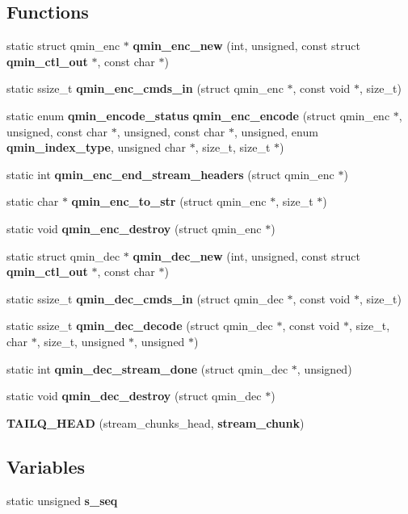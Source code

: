 \subsection*{Functions}
\begin{DoxyCompactItemize}
\item 
static struct qmin\+\_\+enc $\ast$ {\bf qmin\+\_\+enc\+\_\+new} (int, unsigned, const struct {\bf qmin\+\_\+ctl\+\_\+out} $\ast$, const char $\ast$)
\item 
static ssize\+\_\+t {\bf qmin\+\_\+enc\+\_\+cmds\+\_\+in} (struct qmin\+\_\+enc $\ast$, const void $\ast$, size\+\_\+t)
\item 
static enum {\bf qmin\+\_\+encode\+\_\+status} {\bf qmin\+\_\+enc\+\_\+encode} (struct qmin\+\_\+enc $\ast$, unsigned, const char $\ast$, unsigned, const char $\ast$, unsigned, enum {\bf qmin\+\_\+index\+\_\+type}, unsigned char $\ast$, size\+\_\+t, size\+\_\+t $\ast$)
\item 
static int {\bf qmin\+\_\+enc\+\_\+end\+\_\+stream\+\_\+headers} (struct qmin\+\_\+enc $\ast$)
\item 
static char $\ast$ {\bf qmin\+\_\+enc\+\_\+to\+\_\+str} (struct qmin\+\_\+enc $\ast$, size\+\_\+t $\ast$)
\item 
static void {\bf qmin\+\_\+enc\+\_\+destroy} (struct qmin\+\_\+enc $\ast$)
\item 
static struct qmin\+\_\+dec $\ast$ {\bf qmin\+\_\+dec\+\_\+new} (int, unsigned, const struct {\bf qmin\+\_\+ctl\+\_\+out} $\ast$, const char $\ast$)
\item 
static ssize\+\_\+t {\bf qmin\+\_\+dec\+\_\+cmds\+\_\+in} (struct qmin\+\_\+dec $\ast$, const void $\ast$, size\+\_\+t)
\item 
static ssize\+\_\+t {\bf qmin\+\_\+dec\+\_\+decode} (struct qmin\+\_\+dec $\ast$, const void $\ast$, size\+\_\+t, char $\ast$, size\+\_\+t, unsigned $\ast$, unsigned $\ast$)
\item 
static int {\bf qmin\+\_\+dec\+\_\+stream\+\_\+done} (struct qmin\+\_\+dec $\ast$, unsigned)
\item 
static void {\bf qmin\+\_\+dec\+\_\+destroy} (struct qmin\+\_\+dec $\ast$)
\item 
{\bf T\+A\+I\+L\+Q\+\_\+\+H\+E\+AD} (stream\+\_\+chunks\+\_\+head, {\bf stream\+\_\+chunk})
\end{DoxyCompactItemize}
\subsection*{Variables}
\begin{DoxyCompactItemize}
\item 
static unsigned {\bf s\+\_\+seq}
\end{DoxyCompactItemize}


